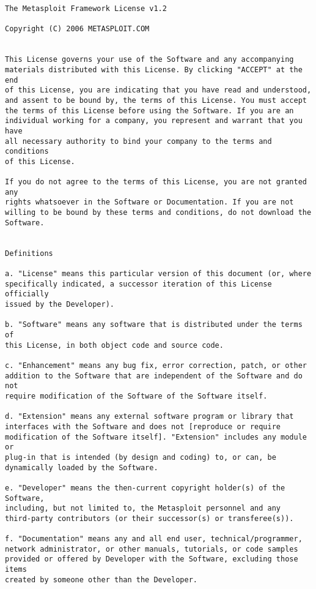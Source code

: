 \documentclass{report}
\begin{document}
{\footnotesize
\begin{verbatim}
The Metasploit Framework License v1.2

Copyright (C) 2006 METASPLOIT.COM


This License governs your use of the Software and any accompanying 
materials distributed with this License. By clicking "ACCEPT" at the end 
of this License, you are indicating that you have read and understood, 
and assent to be bound by, the terms of this License. You must accept 
the terms of this License before using the Software. If you are an 
individual working for a company, you represent and warrant that you have 
all necessary authority to bind your company to the terms and conditions 
of this License. 

If you do not agree to the terms of this License, you are not granted any 
rights whatsoever in the Software or Documentation. If you are not 
willing to be bound by these terms and conditions, do not download the 
Software.


Definitions

a. "License" means this particular version of this document (or, where 
specifically indicated, a successor iteration of this License officially 
issued by the Developer). 

b. "Software" means any software that is distributed under the terms of 
this License, in both object code and source code. 

c. "Enhancement" means any bug fix, error correction, patch, or other 
addition to the Software that are independent of the Software and do not 
require modification of the Software of the Software itself.

d. "Extension" means any external software program or library that 
interfaces with the Software and does not [reproduce or require 
modification of the Software itself]. "Extension" includes any module or 
plug-in that is intended (by design and coding) to, or can, be 
dynamically loaded by the Software. 

e. "Developer" means the then-current copyright holder(s) of the Software, 
including, but not limited to, the Metasploit personnel and any 
third-party contributors (or their successor(s) or transferee(s)). 

f. "Documentation" means any and all end user, technical/programmer, 
network administrator, or other manuals, tutorials, or code samples 
provided or offered by Developer with the Software, excluding those items 
created by someone other than the Developer. 


\end{verbatim}}
\end{document}
